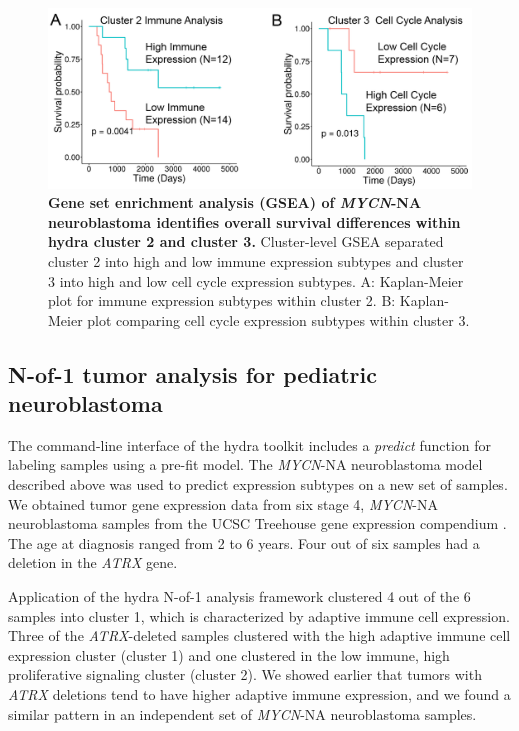 \documentclass[10pt,letterpaper]{article}
\begin{document}
\begin{figure}[!h]
	\includegraphics[width=\textwidth]{img/PNG/SubCluster-Survival-V2-2x}
	\caption{{\bf Gene set enrichment analysis (GSEA) of \textit{MYCN}-NA neuroblastoma identifies overall survival differences within hydra cluster 2 and cluster 3.}
		Cluster-level GSEA separated cluster 2 into high and low immune expression subtypes and cluster 3 into high and low cell cycle expression subtypes. A: Kaplan-Meier plot for immune expression subtypes within cluster 2. B: Kaplan-Meier plot comparing cell cycle expression subtypes within cluster 3.}
	\label{subcluster}
\end{figure}

\subsection*{N-of-1 tumor analysis for pediatric neuroblastoma}
The command-line interface of the hydra toolkit includes a \textit{predict} function for labeling samples using a pre-fit model. The \textit{MYCN}-NA neuroblastoma model described above was used to predict expression subtypes on a new set of samples. We obtained tumor gene expression data from six stage 4, \textit{MYCN}-NA neuroblastoma samples from the UCSC Treehouse gene expression compendium \cite{newtonTumorMapExploringMolecular2017, vaskeComparativeTumorRNA2019}. The age at diagnosis ranged from 2 to 6 years. Four out of six samples had a deletion in the \textit{ATRX} gene. 

Application of the hydra N-of-1 analysis framework clustered 4 out of the 6 samples into cluster 1, which is characterized by adaptive immune cell expression. Three of the \textit{ATRX}-deleted samples clustered with the high adaptive immune cell expression cluster (cluster 1) and one clustered in the low immune, high proliferative signaling cluster (cluster 2). We showed earlier that tumors with \textit{ATRX} deletions tend to have higher adaptive immune expression, and we found a similar pattern in an independent set of \textit{MYCN}-NA neuroblastoma samples. 
\end{document}
